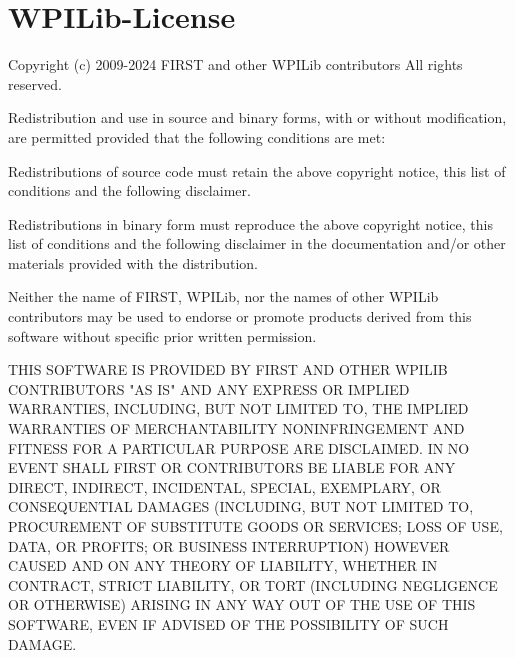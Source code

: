 \chapter{WPILib-\/\+License}
\hypertarget{md__w_p_i_lib-_license}{}\label{md__w_p_i_lib-_license}
Copyright (c) 2009-\/2024 FIRST and other WPILib contributors All rights reserved.

Redistribution and use in source and binary forms, with or without modification, are permitted provided that the following conditions are met\+:
\begin{DoxyItemize}
\item Redistributions of source code must retain the above copyright notice, this list of conditions and the following disclaimer.
\item Redistributions in binary form must reproduce the above copyright notice, this list of conditions and the following disclaimer in the documentation and/or other materials provided with the distribution.
\item Neither the name of FIRST, WPILib, nor the names of other WPILib contributors may be used to endorse or promote products derived from this software without specific prior written permission.
\end{DoxyItemize}

THIS SOFTWARE IS PROVIDED BY FIRST AND OTHER WPILIB CONTRIBUTORS "{}\+AS IS"{} AND ANY EXPRESS OR IMPLIED WARRANTIES, INCLUDING, BUT NOT LIMITED TO, THE IMPLIED WARRANTIES OF MERCHANTABILITY NONINFRINGEMENT AND FITNESS FOR A PARTICULAR PURPOSE ARE DISCLAIMED. IN NO EVENT SHALL FIRST OR CONTRIBUTORS BE LIABLE FOR ANY DIRECT, INDIRECT, INCIDENTAL, SPECIAL, EXEMPLARY, OR CONSEQUENTIAL DAMAGES (INCLUDING, BUT NOT LIMITED TO, PROCUREMENT OF SUBSTITUTE GOODS OR SERVICES; LOSS OF USE, DATA, OR PROFITS; OR BUSINESS INTERRUPTION) HOWEVER CAUSED AND ON ANY THEORY OF LIABILITY, WHETHER IN CONTRACT, STRICT LIABILITY, OR TORT (INCLUDING NEGLIGENCE OR OTHERWISE) ARISING IN ANY WAY OUT OF THE USE OF THIS SOFTWARE, EVEN IF ADVISED OF THE POSSIBILITY OF SUCH DAMAGE. 